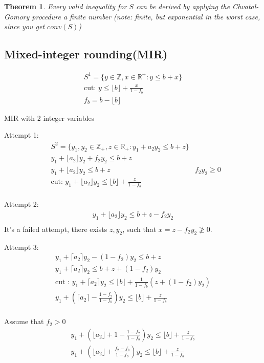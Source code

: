 \documentclass{article}
\theoremstyle{plain}
\newtheorem{thm}{Theorem}
\theoremstyle{definition}
\newcommand{\floor}[1]{\lfloor #1 \rfloor}
\newcommand{\ceiling}[1]{\lceil #1 \rceil}
\begin{document}
\begin{thm}
    Every valid inequality for $S$ can be derived by applying the
    Chvatal-Gomory procedure a finite number
    (note: finite, but exponential in the worst case, since you get $conv(S)$)
\end{thm}

\subsection{Mixed-integer rounding(MIR)}
\begin{gather*}
    S^1 = \{y\in\mathbb{Z}, x\in\mathbb{R}^+: y\leq b+x\}\\
    \text{cut: } y\leq \floor{b} + \frac{x}{1-f_b}\\
    f_b = b - \floor{b}
\end{gather*}

MIR with 2 integer variables

Attempt 1:
\begin{align*}
    &S^2 = \{y_1, y_2\in\mathbb{Z}_+, z\in\mathbb{R}_+: y_1 + a_2y_2\leq b+z\}\\
    &y_1 + \floor{a_2}y_2 + f_2y_2 \leq b+z\\
    &y_1 + \floor{a_2}y_2 \leq b+z & f_2y_2 \geq 0\\
    &\text{cut: } y_1 + \floor{a_2}y_2 \leq \floor{b} + \frac{z}{1-f_b}\\
\end{align*}


Attempt 2:
\begin{align*}
    y_1 + \floor{a_2}y_2 \leq b + z - f_2y_2\\
\end{align*}
It's a failed attempt, there exists $z, y_2$, such that $x =z-f_2y_2 \not\geq 0$.

Attempt 3:
\begin{gather*}
    y_1 + \ceiling{a_2}y_2 - (1-f_2)y_2 \leq b + z\\
    y_1 + \ceiling{a_2}y_2 \leq b + z + (1-f_2)y_2\\
    \text{cut : } y_1 + \ceiling{a_2}y_2 \leq \floor{b} + \frac{1}{1-f_b}(z+(1-f_2)y_2)\\
    y_1 + (\ceiling{a_2}-\frac{1-f_2}{1-f_b})y_2 \leq \floor{b} + \frac{z}{1-f_b}\\
\end{gather*}

Assume that $f_2 > 0$
\begin{align*}
    y_1 + (\floor{a_2} + 1 - \frac{1 - f_2}{1-f_b})y_2 \leq \floor{b} + \frac{z}{1-f_b}\\
    y_1 + (\floor{a_2} + \frac{f_2 - f_b}{1-f_b})y_2 \leq \floor{b} + \frac{z}{1-f_b}\\
\end{align*}
\end{document}
